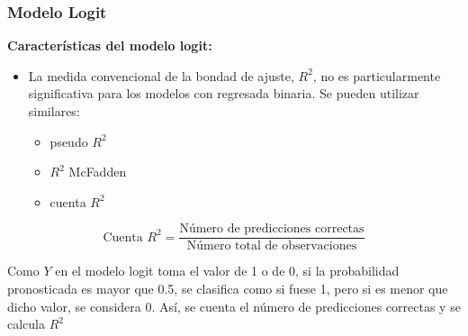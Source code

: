 \documentclass[10pt]{beamer}
\begin{document}
\begin{frame}
\frametitle{Modelo Logit}

\textbf{Características del modelo logit:}

\vspace{4mm}

\begin{itemize}
\item La medida convencional de la bondad de ajuste, $R^2$, no es particularmente significativa para los modelos con regresada binaria. Se pueden utilizar similares:

\vspace{4mm}

\begin{itemize}
\item pseudo $R^2$
\item $R^2$ McFadden
\item cuenta $R^2$


\end{itemize}

\end{itemize}

\begin{equation}
\mbox{Cuenta } R^2 = \frac{\mbox{Número de predicciones correctas}}{\mbox{Número total de observaciones}}
\end{equation}
\vspace{4mm}

Como $Y$ en el modelo logit toma el valor de 1 o de 0, si la probabilidad pronosticada es mayor que 0.5, se clasifica como si fuese 1, pero si es menor que dicho valor, se considera 0. Así, se cuenta el número de predicciones correctas y se calcula $R^2$

\end{frame}










\end{document}
